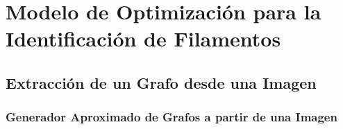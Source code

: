 \chapter{Modelo de Optimizaci\'on para la Identificaci\'on de Filamentos}

\section{Extracci\'on de un Grafo desde una Imagen}
\subsection{Generador Aproximado de Grafos a partir de una Imagen}

